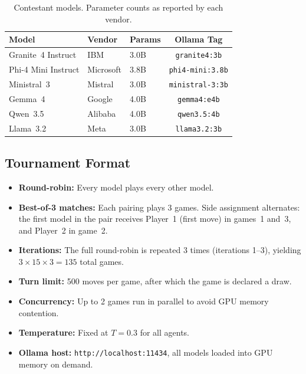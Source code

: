 \documentclass[11pt]{article}
\begin{document}
\begin{table}[H]
\centering
\caption{Contestant models. Parameter counts as reported by each vendor.}
\label{tab:models}
\begin{tabular}{lllc}
\toprule
\textbf{Model} & \textbf{Vendor} & \textbf{Params} & \textbf{Ollama Tag} \\
\midrule
Granite~4 Instruct         & IBM       & 3.0B & \texttt{granite4:3b} \\
Phi-4 Mini Instruct        & Microsoft & 3.8B & \texttt{phi4-mini:3.8b} \\
Ministral~3                & Mistral   & 3.0B & \texttt{ministral-3:3b} \\
Gemma~4                    & Google    & 4.0B & \texttt{gemma4:e4b} \\
Qwen~3.5                   & Alibaba   & 4.0B & \texttt{qwen3.5:4b} \\
Llama~3.2                  & Meta      & 3.0B & \texttt{llama3.2:3b} \\
\bottomrule
\end{tabular}
\end{table}

\subsection{Tournament Format}

\begin{itemize}[nosep]
\item \textbf{Round-robin:} Every model plays every other model.
\item \textbf{Best-of-3 matches:} Each pairing plays 3 games. Side assignment alternates: the first model in the pair receives Player~1 (first move) in games~1 and~3, and Player~2 in game~2.
\item \textbf{Iterations:} The full round-robin is repeated 3 times (iterations 1--3), yielding $3 \times 15 \times 3 = 135$ total games.
\item \textbf{Turn limit:} 500 moves per game, after which the game is declared a draw.
\item \textbf{Concurrency:} Up to 2 games run in parallel to avoid GPU memory contention.
\item \textbf{Temperature:} Fixed at $T = 0.3$ for all agents.
\item \textbf{Ollama host:} \texttt{http://localhost:11434}, all models loaded into GPU memory on demand.
\end{itemize}
\end{document}
